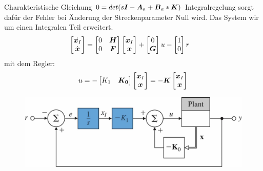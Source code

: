 \begin{tcolorbox}[colback=white!10!white,colframe=green!30!black,title=Integralregelung]
    Charakteristische Gleichung $0=det(s\boldsymbol{I}-\boldsymbol{A}_a+\boldsymbol{B}_a*\boldsymbol{K})$
    Integralregelung  sorgt dafür der Fehler bei Änderung der Streckenparameter Null wird. Das System wir um einen Integralen Teil erweitert.
    \begin{align*}
        \begin{bmatrix}
        \dot{    \boldsymbol{x}_I} \\ \dot{    \boldsymbol{x}}
        \end{bmatrix} &= \begin{bmatrix}
        0 & \boldsymbol{H} \\ 0 & \boldsymbol{F}
        \end{bmatrix}\begin{bmatrix}
            \boldsymbol{x}_I \\    \boldsymbol{x}
        \end{bmatrix}+
        \begin{bmatrix}
        0 \\ \boldsymbol{G}
        \end{bmatrix} u - \begin{bmatrix}
        1 \\ 0
        \end{bmatrix}r
    \end{align*}
    mit dem Regler:
    \begin{align*}
        u = -\begin{bmatrix}
         K_1 & \boldsymbol{K_0}
        \end{bmatrix} \begin{bmatrix}
            \boldsymbol{x}_I \\\boldsymbol{x}
        \end{bmatrix} = - \boldsymbol{K} \begin{bmatrix}
        \boldsymbol{x}_I \\\boldsymbol{x}
        \end{bmatrix}
    \end{align*}
    
    \begin{figure}[H]
\centering
\includegraphics[width=0.7\linewidth]{images/integral}


\end{figure}
\end{tcolorbox}
